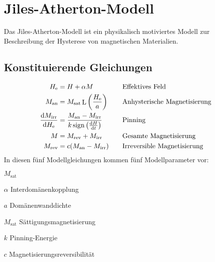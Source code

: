 \documentclass{scrartcl}
\DeclareMathOperator{\sign}{sign}
\DeclareMathOperator{\Langevin}{L}
\newcommand{\He}{H_\text{e}}
\newcommand{\Man}{M_\text{an}}
\newcommand{\Msat}{M_\text{sat}}
\newcommand{\Mirr}{M_\text{irr}}
\newcommand{\Mrev}{M_\text{rev}}
\begin{document}
\section{Jiles-Atherton-Modell}
Das Jiles-Atherton-Modell ist ein physikalisch motiviertes Modell zur Beschreibung der Hysterese von magnetischen Materialien.
\subsection{Konstituierende Gleichungen}
\begin{align}
	\He &= H + \alpha M \quad &&\text{Effektives Feld} \label{eq:h_eff}\\
	\Man &= \Msat \Langevin\left(\frac{\He}{a}\right) \quad &&\text{Anhysterische Magnetisierung}  \label{eq:m_an}\\
	\frac{\dif\Mirr}{\dif \He} &= \frac{\Man - \Mirr}{k \sign\left(\frac{\dif H}{\dif t}\right)} \quad &&\text{Pinning} \label{eq:pinning}\\
	M &= \Mrev + \Mirr \quad &&\text{Gesamte Magnetisierung} \label{eq:m_gesamt}\\
	\Mrev &= c(\Man - \Mirr) \quad &&\text{Irreversible Magnetisierung} \label{eq:m_rev}
\end{align}
In diesen fünf Modellgleichungen kommen fünf Modellparameter vor:
\begin{labeling}{$\Msat$}
	\item[$\alpha$]{Interdomänenkopplung}
	\item[$a$]{Domänenwanddichte}
	\item[$\Msat$]{Sättigungsmagnetisierung}
	\item[$k$]{Pinning-Energie}
	\item[$c$]{Magnetisierungsreversibilität}
\end{labeling}
\end{document}

